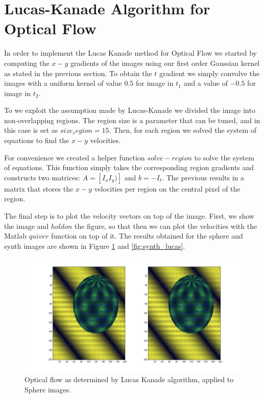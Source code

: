\documentclass[11pt]{article}
\begin{document}
\section{Lucas-Kanade Algorithm for Optical Flow}
In order to implement the Lucas Kanade method for Optical Flow we started by computing the $x-y$ gradients of the images using our first order Gaussian kernel as stated in the previous section. %
To obtain the $t$ gradient we simply convolve the images with a uniform kernel of value $0.5$ for image in $t_1$ and a value of $- 0.5$ for image in $t_2$. 

To we exploit the assumption made by Lucas-Kanade we divided the image into non-overlapping regions. The region size is a parameter that can be tuned, and in this case is set as $size_region = 15$. Then, for each region we solved the system of equations to find the $x-y$ velocities.

For convenience we created a helper function $solve-region$ to solve the system of equations. This function simply takes the corresponding region gradients and constructs two matrices: $A = [I_x I_y)]$ and $b = -I_t$. The previous results in a matrix that stores the $x-y$ velocities per region on the central pixel of the region. 

The final step is to plot the velocity vectors on top of the image. First, we show the image and $hold on$ the figure, so that then we can plot the velocities with the Matlab $quiver$ function on top of it. The results obtained for the sphere and synth images are shown in Figure \ref{fig:sphere_lucas} and \ref{fig:synth_lucas}.


\begin{figure}[H] \centering
	\includegraphics[width=.8\textwidth]{imgs/sphere.jpg}
	\caption{Optical flow as determined by Lucas Kanade algorithm, applied to Sphere images.}
	\label{fig:sphere_lucas}
\end{figure}
\end{document}
